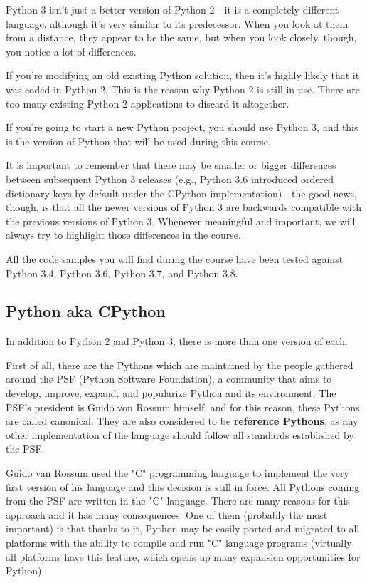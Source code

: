 \documentclass[a4paper,10pt]{article}
\begin{document}
Python 3 isn't just a better version of Python 2 - it is a completely different language, although it's very similar to its predecessor. When you look at them from a distance, they appear to be the same, but when you look closely, though, you notice a lot of differences.
\newline

If you're modifying an old existing Python solution, then it's highly likely that it was coded in Python 2. This is the reason why Python 2 is still in use. There are too many existing Python 2 applications to discard it altogether.
\newline

If you're going to start a new Python project, you should use Python 3, and this is the version of Python that will be used during this course.
\newline

It is important to remember that there may be smaller or bigger differences between subsequent Python 3 releases (e.g., Python 3.6 introduced ordered dictionary keys by default under the CPython implementation) - the good news, though, is that all the newer versions of Python 3 are backwards compatible with the previous versions of Python 3. Whenever meaningful and important, we will always try to highlight those differences in the course.
\newline

All the code samples you will find during the course have been tested against Python 3.4, Python 3.6, Python 3.7, and Python 3.8.

\subsection{Python aka CPython}
In addition to Python 2 and Python 3, there is more than one version of each.
\newline

First of all, there are the Pythons which are maintained by the people gathered around the PSF (Python Software Foundation), a community that aims to develop, improve, expand, and popularize Python and its environment. The PSF's president is Guido von Rossum himself, and for this reason, these Pythons are called canonical. They are also considered to be \textbf{reference Pythons}, as any other implementation of the language should follow all standards established by the PSF.
\newline

Guido van Rossum used the "C" programming language to implement the very first version of his language and this decision is still in force. All Pythons coming from the PSF are written in the "C" language. There are many reasons for this approach and it has many consequences. One of them (probably the most important) is that thanks to it, Python may be easily ported and migrated to all platforms with the ability to compile and run "C" language programs (virtually all platforms have this feature, which opens up many expansion opportunities for Python).
\newline
\end{document}
